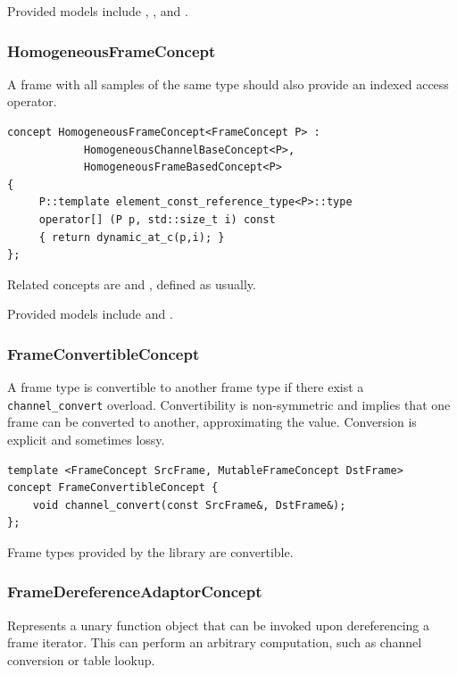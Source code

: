 Provided models include , ,
 and
.

\subsubsection{{HomogeneousFrameConcept}}

A frame with all samples of the same type should also provide an
indexed access operator.

\begin{lstlisting}
concept HomogeneousFrameConcept<FrameConcept P> :
            HomogeneousChannelBaseConcept<P>, 
            HomogeneousFrameBasedConcept<P> 
{ 
     P::template element_const_reference_type<P>::type 
     operator[] (P p, std::size_t i) const 
     { return dynamic_at_c(p,i); }
};
\end{lstlisting}

Related concepts are  and
, defined as usually.

Provided models include  and
.

\subsubsection{{FrameConvertibleConcept}}

A frame type is convertible to another frame type if there exist a
\texttt{channel\_\-convert} overload. Convertibility is non-symmetric
and implies that one frame can be converted to another, approximating
the value. Conversion is explicit and sometimes lossy.

\begin{lstlisting}
template <FrameConcept SrcFrame, MutableFrameConcept DstFrame>
concept FrameConvertibleConcept {
    void channel_convert(const SrcFrame&, DstFrame&);
};
\end{lstlisting}

Frame types provided by the library are convertible.

\subsubsection{{FrameDereferenceAdaptorConcept}}

Represents a unary function object that can be invoked upon
dereferencing a frame iterator. This can perform an arbitrary
computation, such as channel conversion or table lookup.

